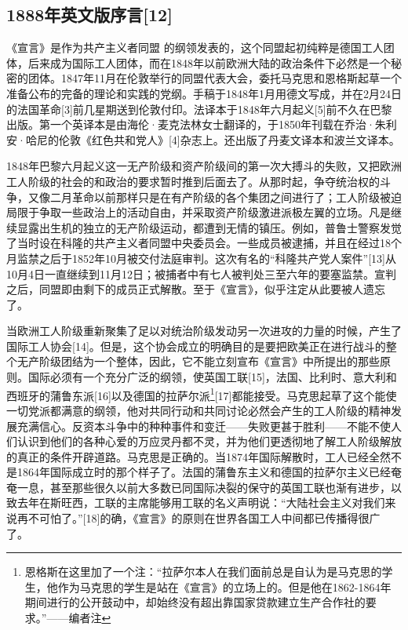 \documentclass[UTF8,zihao=-4,a4paper]{ctexart}
\begin{document}
\subsection*{1888年英文版序言[12]}
《宣言》是作为共产主义者同盟 的纲领发表的，这个同盟起初纯粹是德国工人团体，后来成为国际工人团体，而在1848年以前欧洲大陆的政治条件下必然是一个秘密的团体。1847年11月在伦敦举行的同盟代表大会，委托马克思和恩格斯起草一个准备公布的完备的理论和实践的党纲。手稿于1848年1月用德文写成，并在2月24日的法国革命[3]前几星期送到伦敦付印。法译本于1848年六月起义[5]前不久在巴黎出版。第一个英译本是由海伦·麦克法林女士翻译的，于1850年刊载在乔治·朱利安·哈尼的伦敦《红色共和党人》[4]杂志上。还出版了丹麦文译本和波兰文译本。\par
1848年巴黎六月起义这一无产阶级和资产阶级间的第一次大搏斗的失败，又把欧洲工人阶级的社会的和政治的要求暂时推到后面去了。从那时起，争夺统治权的斗争，又像二月革命以前那样只是在有产阶级的各个集团之间进行了；工人阶级被迫局限于争取一些政治上的活动自由，并采取资产阶级激进派极左翼的立场。凡是继续显露出生机的独立的无产阶级运动，都遭到无情的镇压。例如，普鲁士警察发觉了当时设在科隆的共产主义者同盟中央委员会。一些成员被逮捕，并且在经过18个月监禁之后于1852年10月被交付法庭审判。这次有名的“科隆共产党人案件”[13]从10月4日一直继续到11月12日；被捕者中有七人被判处三至六年的要塞监禁。宣判之后，同盟即由剩下的成员正式解散。至于《宣言》，似乎注定从此要被人遗忘了。\par
当欧洲工人阶级重新聚集了足以对统治阶级发动另一次进攻的力量的时候，产生了国际工人协会[14]。但是，这个协会成立的明确目的是要把欧美正在进行战斗的整个无产阶级团结为一个整体，因此，它不能立刻宣布《宣言》中所提出的那些原则。国际必须有一个充分广泛的纲领，使英国工联[15]，法国、比利时、意大利和西班牙的蒲鲁东派[16]以及德国的拉萨尔派\footnote{恩格斯在这里加了一个注：“拉萨尔本人在我们面前总是自认为是马克思的学生，他作为马克思的学生是站在《宣言》的立场上的。但是他在1862-1864年期间进行的公开鼓动中，却始终没有超出靠国家贷款建立生产合作社的要求。”——编者注}[17]都能接受。马克思起草了这个能使一切党派都满意的纲领，他对共同行动和共同讨论必然会产生的工人阶级的精神发展充满信心。反资本斗争中的种种事件和变迁——失败更甚于胜利——不能不使人们认识到他们的各种心爱的万应灵丹都不灵，并为他们更透彻地了解工人阶级解放的真正的条件开辟道路。马克思是正确的。当1874年国际解散时，工人已经全然不是1864年国际成立时的那个样子了。法国的蒲鲁东主义和德国的拉萨尔主义已经奄奄一息，甚至那些很久以前大多数已同国际决裂的保守的英国工联也渐有进步，以致去年在斯旺西，工联的主席能够用工联的名义声明说：“大陆社会主义对我们来说再不可怕了。”[18]的确，《宣言》的原则在世界各国工人中间都已传播得很广了。\par
\end{document}
